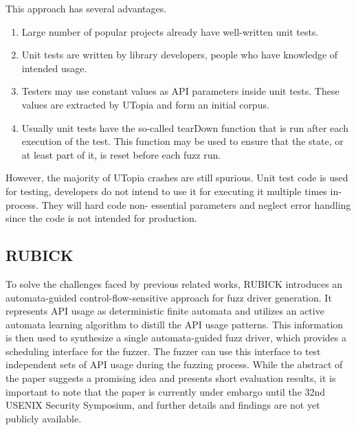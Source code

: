 \documentclass[a4paper,11pt,oneside]{report}
\begin{document}
This approach has several advantages. 
\begin{enumerate}
  \item Large number of popular projects already have 
  well-written unit tests.
  \item Unit tests are written by library developers, 
  people who have knowledge of intended usage.
  \item Testers may use constant values as API parameters 
  inside unit tests. These values are extracted by UTopia
  and form an initial corpus.
  \item Usually unit tests have the so-called tearDown function
  that is run after each execution of the test. This function may 
  be used to ensure that the state, or at least part of it, is reset
  before each fuzz run.
\end{enumerate}

However, the majority of UTopia crashes are still spurious. Unit test
code is used for testing, developers do not intend to use it for 
executing it multiple times in-process. They will hard code non-
essential parameters and neglect error handling since the code is not
intended for production. 


\subsection{RUBICK}


To solve the challenges faced by previous related works, RUBICK
introduces an automata-guided control-flow-sensitive approach for
fuzz driver generation. It represents API usage as deterministic 
finite automata and utilizes an active automata learning algorithm 
to distill the API usage patterns. This information is then 
used to synthesize a single automata-guided fuzz driver, 
which provides a scheduling interface for the fuzzer. 
The fuzzer can use this interface to test independent 
sets of API usage during the fuzzing process. While the 
abstract of the paper suggests a promising idea and 
presents short evaluation results, it is important to note 
that the paper is currently under embargo until the 
32nd USENIX Security Symposium, and further details and 
findings are not yet publicly available.





\end{document}
